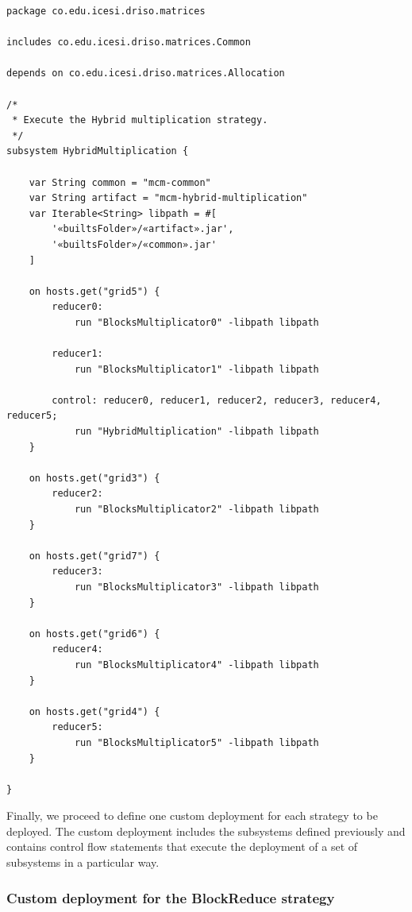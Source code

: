 \documentclass{article}
\begin{document}
\begin{lstlisting}[style=amelia,caption=Subsystem for executing Hybrid strategy.]
package co.edu.icesi.driso.matrices

includes co.edu.icesi.driso.matrices.Common

depends on co.edu.icesi.driso.matrices.Allocation

/*
 * Execute the Hybrid multiplication strategy.
 */
subsystem HybridMultiplication {
	
	var String common = "mcm-common"
	var String artifact = "mcm-hybrid-multiplication"
	var Iterable<String> libpath = #[
        '«builtsFolder»/«artifact».jar',
        '«builtsFolder»/«common».jar'
	]

    on hosts.get("grid5") {
        reducer0:
			run "BlocksMultiplicator0" -libpath libpath

        reducer1:
			run "BlocksMultiplicator1" -libpath libpath

        control: reducer0, reducer1, reducer2, reducer3, reducer4, reducer5;
			run "HybridMultiplication" -libpath libpath
	}
	
	on hosts.get("grid3") {
		reducer2:
			run "BlocksMultiplicator2" -libpath libpath
	}
	
	on hosts.get("grid7") {
		reducer3:
			run "BlocksMultiplicator3" -libpath libpath
	}
	
	on hosts.get("grid6") {
		reducer4:
			run "BlocksMultiplicator4" -libpath libpath
	}
	
	on hosts.get("grid4") {
		reducer5:
			run "BlocksMultiplicator5" -libpath libpath
	}
	
}
\end{lstlisting}

Finally, we proceed to define one custom deployment for each strategy to be deployed. The custom deployment includes the subsystems defined previously and contains control flow statements that execute the deployment of a set of subsystems in a particular way. \\

\subsubsection{Custom deployment for the BlockReduce strategy}
\end{document}
